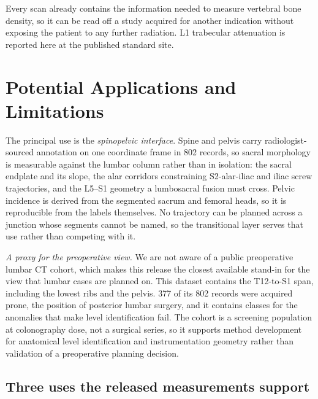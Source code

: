 \documentclass[aapm,mph,amsmath,amssymb,preprint,linenumbers]{revtex4-2}
\begin{document}

Every scan already contains the information needed to measure vertebral bone density, so it
can be read off a study acquired for another indication without exposing the patient to any
further radiation.\cite{pickhardt2013} L1 trabecular attenuation is reported here at the
published standard site.

\section{Potential Applications and Limitations}\label{sec:applications}

The principal use is the \emph{spinopelvic interface}. Spine and pelvis carry
radiologist-sourced annotation on one coordinate frame in 802 records, so sacral morphology is
measurable against the lumbar column rather than in isolation: the sacral endplate and its
slope, the alar corridors constraining S2-alar-iliac and iliac screw trajectories, and the
L5--S1 geometry a lumbosacral fusion must cross. Pelvic incidence is derived from the segmented
sacrum and femoral heads, so it is reproducible from the labels themselves. No trajectory can
be planned across a junction whose segments cannot be named, so the transitional layer serves
that use rather than competing with it.

\emph{A proxy for the preoperative view.} We are not aware of a public preoperative lumbar CT cohort, which makes this release the
closest available stand-in for the view that lumbar cases are planned on. This dataset contains the T12-to-S1 span, including the lowest ribs and the pelvis. 377 of its 802 records were acquired prone, the position of posterior lumbar surgery, and it contains classes for the anomalies that make level identification fail. The cohort is a screening population at colonography dose, not a surgical series, so it supports method development for anatomical level identification and instrumentation geometry rather than validation of a preoperative planning decision.

\subsection{Three uses the released measurements support}
\end{document}
